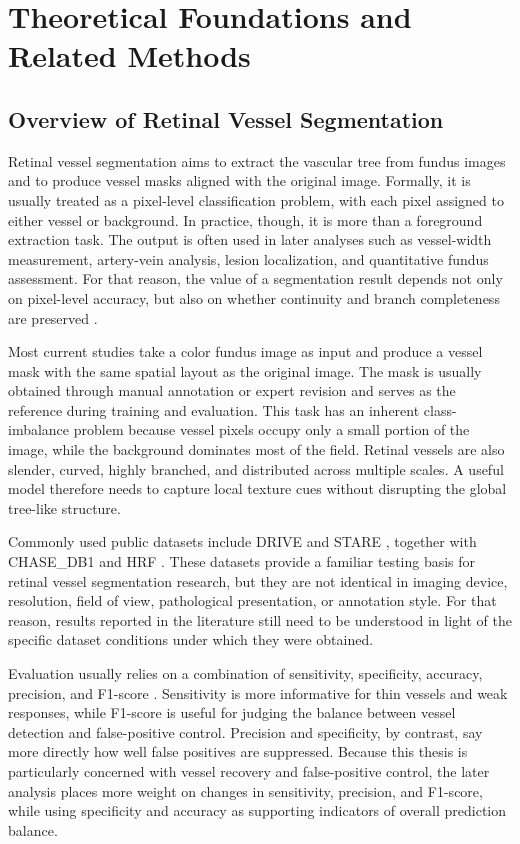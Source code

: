 \documentclass[a4paper,11pt]{article}
\begin{document}
\section{Theoretical Foundations and Related Methods}

\subsection{Overview of Retinal Vessel Segmentation}
Retinal vessel segmentation aims to extract the vascular tree from fundus images and to produce vessel masks aligned with the original image. Formally, it is usually treated as a pixel-level classification problem, with each pixel assigned to either vessel or background. In practice, though, it is more than a foreground extraction task. The output is often used in later analyses such as vessel-width measurement, artery-vein analysis, lesion localization, and quantitative fundus assessment. For that reason, the value of a segmentation result depends not only on pixel-level accuracy, but also on whether continuity and branch completeness are preserved \cite{staal2004drive,hoover2000locating}.

Most current studies take a color fundus image as input and produce a vessel mask with the same spatial layout as the original image. The mask is usually obtained through manual annotation or expert revision and serves as the reference during training and evaluation. This task has an inherent class-imbalance problem because vessel pixels occupy only a small portion of the image, while the background dominates most of the field. Retinal vessels are also slender, curved, highly branched, and distributed across multiple scales. A useful model therefore needs to capture local texture cues without disrupting the global tree-like structure.

Commonly used public datasets include DRIVE and STARE \cite{staal2004drive,hoover2000locating}, together with CHASE\_DB1 and HRF \cite{chasedb12013,budai2013robust}. These datasets provide a familiar testing basis for retinal vessel segmentation research, but they are not identical in imaging device, resolution, field of view, pathological presentation, or annotation style. For that reason, results reported in the literature still need to be understood in light of the specific dataset conditions under which they were obtained.

Evaluation usually relies on a combination of sensitivity, specificity, accuracy, precision, and F1-score \cite{staal2004drive,hoover2000locating}. Sensitivity is more informative for thin vessels and weak responses, while F1-score is useful for judging the balance between vessel detection and false-positive control. Precision and specificity, by contrast, say more directly how well false positives are suppressed. Because this thesis is particularly concerned with vessel recovery and false-positive control, the later analysis places more weight on changes in sensitivity, precision, and F1-score, while using specificity and accuracy as supporting indicators of overall prediction balance.
\end{document}
